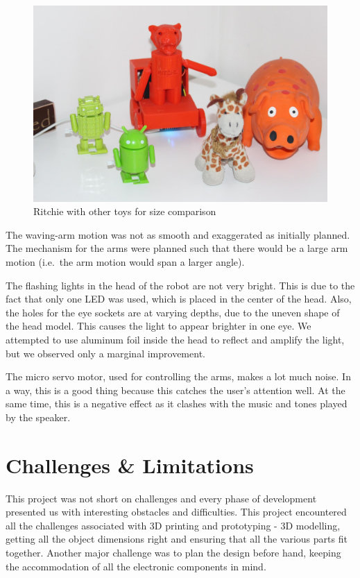 \documentclass{sigchi-ext}
\begin{document}
\begin{figure}
  \includegraphics[width=0.9\columnwidth]{../photos/size}
  \caption{Ritchie with other toys for size comparison}
  \label{fig:size}
\end{figure}

The waving-arm motion was not as smooth and exaggerated as initially planned.
The mechanism for the arms were planned such that there would be a large arm
motion (i.e.\ the arm motion would span a larger angle).

The flashing lights in the head of the robot are not very bright. This is due
to the fact that only one LED was used, which is placed in the center of the
head. Also, the holes for the eye sockets are at varying depths, due to the
uneven shape of the head model. This causes the light to appear brighter in one
eye. We attempted to use aluminum foil inside the head to reflect and amplify
the light, but we observed only a marginal improvement.

The micro servo motor, used for controlling the arms, makes a lot much noise.
In a way, this is a good thing because this catches the user's attention well.
At the same time, this is a negative effect as it clashes with the music and
tones played by the speaker.

\section{Challenges \& Limitations}

This project was not short on challenges and every phase of development
presented us with interesting obstacles and difficulties. This project
encountered all the challenges associated with 3D printing and prototyping - 3D
modelling, getting all the object dimensions right and ensuring that all the
various parts fit together. Another major challenge was to plan the design
before hand, keeping the accommodation of all the electronic components in
mind.
\end{document}
